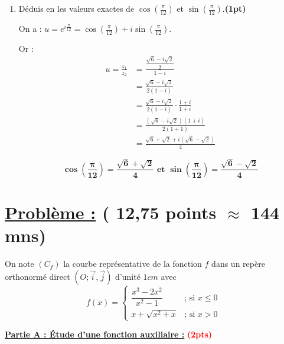 \documentclass[12pt,a4paper]{article}
\begin{document}
\begin{enumerate}
\begin{enumerate}
\begin{itemize}
\begin{itemize}
 \begin{resultbox}
    \[
    \mathbf{ \arg(u^{5}) =\frac{5\pi}{12} [2\pi] }
    \]
\end{resultbox}

\end{itemize}

\end{itemize}        
        
        \item Déduis en les valeurs exactes de $\cos\left(\frac{\pi}{12}\right)$ et $\sin\left(\frac{\pi}{12}\right)$.\hfill \textbf{(1pt)}

On a :
\(
u=e^{i\frac{\pi}{12}}=\cos\left(\frac{\pi}{12}\right)
+i\sin\left(\frac{\pi}{12}\right).
\)

Or :
\[
\begin{aligned}
u=\frac{z_1}{z_2}
&= \frac{\dfrac{\sqrt{6}-i\sqrt{2}}{2}}{1-i} \\[4pt]
&= \frac{\sqrt{6}-i\sqrt{2}}{2(1-i)} \\[4pt]
&= \frac{\sqrt{6}-i\sqrt{2}}{2(1-i)} \cdot \frac{1+i}{1+i} \\[4pt]
&= \frac{(\sqrt{6}-i\sqrt{2})(1+i)}{2(1+1)} \\[4pt]
&= \frac{\sqrt{6}+\sqrt{2} + i(\sqrt{6}-\sqrt{2})}{4}
\end{aligned}
\]      
     \begin{resultbox}
    \[
    \mathbf{ \cos\left(\frac{\pi}{12}\right)=\frac{\sqrt{6}+\sqrt{2}}{4} \textbf{ et } \sin\left(\frac{\pi}{12}\right)=\frac{\sqrt{6}-\sqrt{2}}{4}}
    \]
\end{resultbox}    
    \end{enumerate}
\end{enumerate}

\section*{\underline{Problème :} ( 12,75 points $\approx$ 144 mns)}
On note $(C_f)$ la courbe représentative de la fonction $f$ dans un repère orthonormé direct $(O;\vec{i},\vec{j})$ d'unité $1cm$ avec
$$
f(x) =
\begin{cases}
\dfrac{x^3 - 2x^2}{x^2 - 1} & \text{; si } x \leq 0 \\
x + \sqrt{x^2 + x} & \text{; si } x > 0
\end{cases}
$$

\underline{\textbf{Partie A : Étude d'une fonction auxiliaire :}} \textcolor{red}{\textbf{(2pts)}}
\end{document}
